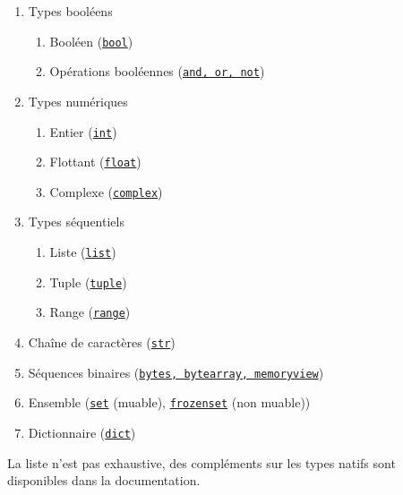 \documentclass[a4paper, 10pt]{article}
\newcommand{\code}[1]{{\small\texttt{#1}}}
\begin{document}
\begin{enumerate}
		\item Types booléens
		\begin{enumerate}
			\item Booléen (\href{https://docs.python.org/fr/3/library/functions.html?highlight=bool#bool}{\code{bool}})
			\item Opérations booléennes (\href{https://docs.python.org/fr/3/library/stdtypes.html#boolean-operations-and-or-not}{\code{and, or, not}})
		\end{enumerate}
        \item Types numériques
        \begin{enumerate}
              \item Entier (\href{https://docs.python.org/fr/3/library/stdtypes.html#typesnumeric}{\code{int}})
              \item Flottant (\href{https://docs.python.org/fr/3/library/stdtypes.html#typesnumeric}{\code{float}})
              \item Complexe (\href{https://docs.python.org/fr/3/library/stdtypes.html#typesnumeric}{\code{complex}})
      \end{enumerate}
     \item Types séquentiels
	\begin{enumerate}
       \item Liste (\href{https://docs.python.org/fr/3/library/stdtypes.html#sequence-types-list-tuple-range}{\code{list}})
		\item Tuple (\href{https://docs.python.org/fr/3/library/stdtypes.html#sequence-types-list-tuple-range}{\code{tuple}})
		\item Range (\href{https://docs.python.org/fr/3/library/stdtypes.html#sequence-types-list-tuple-range}{\code{range}})
	\end{enumerate}
        \item Chaîne de caractères (\href{https://docs.python.org/fr/3/library/string.html?highlight=str#module-string}{\code{str}})
		\item Séquences binaires (\href{https://docs.python.org/fr/3/library/stdtypes.html#binary-sequence-types-bytes-bytearray-memoryview}{\code{bytes, bytearray, memoryview}})
		\item Ensemble (\href{https://docs.python.org/fr/3/library/stdtypes.html#set-types-set-frozenset}{\code{set}} (muable), \href{https://docs.python.org/fr/3/library/stdtypes.html#set-types-set-frozenset}{\code{frozenset}} (non muable)) 
		\item Dictionnaire (\href{https://docs.python.org/fr/3/library/stdtypes.html#mapping-types-dict}{\code{dict}})
\end{enumerate}
La liste n'est pas exhaustive, des compléments sur les types natifs sont disponibles dans la documentation.
\end{document}
